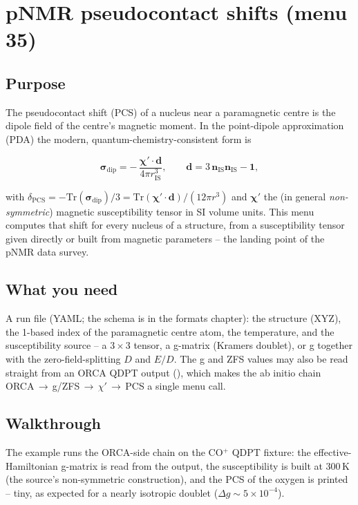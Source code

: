 \chapter{pNMR pseudocontact shifts (menu 35)}
\label{ch:menu35}

\section{Purpose}

The pseudocontact shift (PCS) of a nucleus near a paramagnetic centre is the
dipole field of the centre's magnetic moment.  In the point-dipole
approximation (PDA) the modern, quantum-chemistry-consistent form is

\begin{equation}
  \boldsymbol{\sigma}_{\mathrm{dip}} = -\,\frac{\boldsymbol{\chi}' \cdot
    \mathbf{d}}{4\pi r_{\mathrm{IS}}^3},
  \qquad \mathbf{d} = 3\,\mathbf{n}_{\mathrm{IS}}\mathbf{n}_{\mathrm{IS}}
    - \mathbf{1},
\end{equation}

with $\delta_{\mathrm{PCS}} = -\mathrm{Tr}(\boldsymbol{\sigma}_{\mathrm{dip}})/3
= \mathrm{Tr}(\boldsymbol{\chi}'\!\cdot\mathbf{d})/(12\pi r^3)$ and
$\boldsymbol{\chi}'$ the (in general \emph{non-symmetric}) magnetic
susceptibility tensor in SI volume units.  This menu computes that shift for
every nucleus of a structure, from a susceptibility tensor given directly or
built from magnetic parameters -- the landing point of the pNMR
data survey.

\section{What you need}

A run file (YAML; the schema is in the formats chapter): the structure (XYZ),
the 1-based index of the paramagnetic centre atom, the temperature, and the
susceptibility source -- a $3\times3$ tensor, a g-matrix (Kramers doublet),
or g together with the zero-field-splitting $D$ and $E/D$.  The g and ZFS
values may also be read straight from an ORCA QDPT output
(), which makes the ab initio chain
ORCA\,$\to$\,g/ZFS\,$\to$\,$\chi'$\,$\to$\,PCS a single menu call.

\section{Walkthrough}

The example runs the ORCA-side chain on the CO$^+$ QDPT fixture: the
effective-Hamiltonian g-matrix is read from the output, the susceptibility is
built at 300\,K (the source's non-symmetric construction), and the PCS of the
oxygen is printed -- tiny, as expected for a nearly isotropic doublet
($\Delta g \sim 5\times10^{-4}$).

